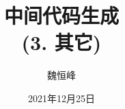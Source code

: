 \documentclass[]{beamer}
\title[语义分析]{中间代码生成 \\ (3. 其它)}
\author[魏恒峰]{\large 魏恒峰}
\institute{hfwei@nju.edu.cn}
\date{2021年12月25日}
\begin{document}
\maketitle



\thankyou{}

\end{document}
